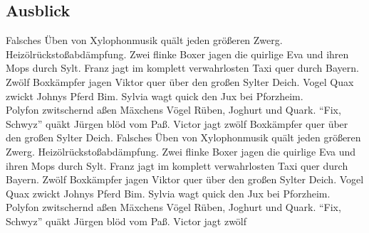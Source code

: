 \subsection{Ausblick}

Falsches Üben von Xylophonmusik quält jeden größeren Zwerg. Heizölrückstoßabdämpfung. Zwei flinke Boxer jagen die quirlige Eva und ihren Mops durch Sylt. Franz jagt im komplett verwahrlosten Taxi quer durch Bayern. Zwölf Boxkämpfer jagen Viktor quer über den großen Sylter Deich. Vogel Quax zwickt Johnys Pferd Bim. Sylvia wagt quick den Jux bei Pforzheim.\\
Polyfon zwitschernd aßen Mäxchens Vögel Rüben, Joghurt und Quark. "`Fix, Schwyz"' quäkt Jürgen blöd vom Paß. Victor jagt zwölf Boxkämpfer quer über den großen Sylter Deich. Falsches Üben von Xylophonmusik quält jeden größeren Zwerg. Heizölrückstoßabdämpfung. Zwei flinke Boxer jagen die quirlige Eva und ihren Mops durch Sylt. Franz jagt im komplett verwahrlosten Taxi quer durch Bayern. Zwölf Boxkämpfer jagen Viktor quer über den großen Sylter Deich. Vogel Quax zwickt Johnys Pferd Bim. Sylvia wagt quick den Jux bei Pforzheim. Polyfon zwitschernd aßen Mäxchens Vögel Rüben, Joghurt und Quark. "`Fix, Schwyz"' quäkt Jürgen blöd vom Paß. Victor jagt zwölf

\newpage
